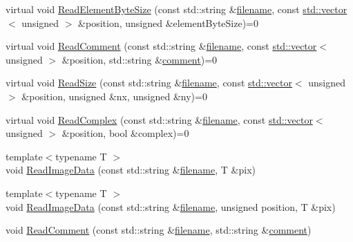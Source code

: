 \begin{DoxyCompactItemize}
\item 
virtual void \hyperlink{class_q_s_t_e_m_1_1_i_data_reader_ac45a59e5cdfc3c913d063e03d1dae231}{Read\-Element\-Byte\-Size} (const std\-::string \&\hyperlink{write_fields2_file_8m_af3723aa817dbb65282d5e1db81f08ad8}{filename}, const \hyperlink{qmb_8m_af54b69a32590de218622e869b06b47b3}{std\-::vector}$<$ unsigned $>$ \&position, unsigned \&element\-Byte\-Size)=0
\item 
virtual void \hyperlink{class_q_s_t_e_m_1_1_i_data_reader_a412a522b1f4935557e194991672b2670}{Read\-Comment} (const std\-::string \&\hyperlink{write_fields2_file_8m_af3723aa817dbb65282d5e1db81f08ad8}{filename}, const \hyperlink{qmb_8m_af54b69a32590de218622e869b06b47b3}{std\-::vector}$<$ unsigned $>$ \&position, std\-::string \&\hyperlink{image_sim_8m_aea4cc4bd8e43a7f8ebf9b0ee3da8d681}{comment})=0
\item 
virtual void \hyperlink{class_q_s_t_e_m_1_1_i_data_reader_a3d6c4f7ff770dbed4889c67320b3017c}{Read\-Size} (const std\-::string \&\hyperlink{write_fields2_file_8m_af3723aa817dbb65282d5e1db81f08ad8}{filename}, const \hyperlink{qmb_8m_af54b69a32590de218622e869b06b47b3}{std\-::vector}$<$ unsigned $>$ \&position, unsigned \&nx, unsigned \&ny)=0
\item 
virtual void \hyperlink{class_q_s_t_e_m_1_1_i_data_reader_a4e3100b921507009b3c2191668ba002f}{Read\-Complex} (const std\-::string \&\hyperlink{write_fields2_file_8m_af3723aa817dbb65282d5e1db81f08ad8}{filename}, const \hyperlink{qmb_8m_af54b69a32590de218622e869b06b47b3}{std\-::vector}$<$ unsigned $>$ \&position, bool \&complex)=0
\item 
{\footnotesize template$<$typename T $>$ }\\void \hyperlink{class_q_s_t_e_m_1_1_i_data_reader_a6458712183f5c84ea7299b478c22f486}{Read\-Image\-Data} (const std\-::string \&\hyperlink{write_fields2_file_8m_af3723aa817dbb65282d5e1db81f08ad8}{filename}, T \&pix)
\item 
{\footnotesize template$<$typename T $>$ }\\void \hyperlink{class_q_s_t_e_m_1_1_i_data_reader_a73573383addf8343a467342178b31bc1}{Read\-Image\-Data} (const std\-::string \&\hyperlink{write_fields2_file_8m_af3723aa817dbb65282d5e1db81f08ad8}{filename}, unsigned position, T \&pix)
\item 
void \hyperlink{class_q_s_t_e_m_1_1_i_data_reader_afdba1451447b760f6eaaefc08d6877ce}{Read\-Comment} (const std\-::string \&\hyperlink{write_fields2_file_8m_af3723aa817dbb65282d5e1db81f08ad8}{filename}, std\-::string \&\hyperlink{image_sim_8m_aea4cc4bd8e43a7f8ebf9b0ee3da8d681}{comment})

\end{DoxyCompactItemize}
